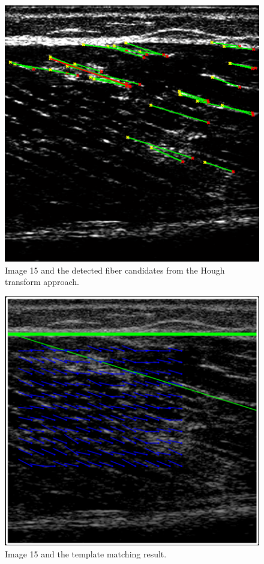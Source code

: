 \documentclass[10pt,twocolumn,letterpaper]{article}
\begin{document}
\begin{figure}
	\begin{center}		
		\includegraphics[width=1\linewidth]{img/im15_hough_fibers}
	\end{center}
	\caption{Image 15 and the detected fiber candidates from the Hough transform approach.}
	\label{fig:im15_hough_fibers}
	
\end{figure}

\begin{figure}
	\begin{center}		
		\includegraphics[width=1\linewidth]{img/im15_templ}
	\end{center}
	\caption{Image 15 and the template matching result.}
	\label{fig:im15_templ}
	
\end{figure}
\end{document}
